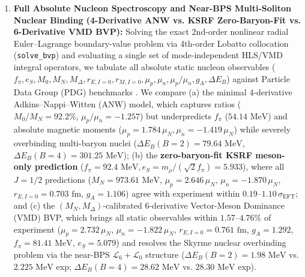 \documentclass[10pt,aps,prd,twocolumn,superscriptaddress,nofootinbib,floatfix,longbibliography,showkeys]{revtex4-2}
\begin{document}
\begin{enumerate}
  \item \textbf{Full Absolute Nucleon Spectroscopy and Near-BPS Multi-Soliton Nuclear Binding (4-Derivative ANW vs. KSRF Zero-Baryon-Fit vs. 6-Derivative VMD BVP):} Solving the exact 2nd-order nonlinear radial Euler--Lagrange boundary-value problem via 4th-order Lobatto collocation (\texttt{solve\_bvp}) and evaluating a single set of mode-independent HLS/VMD integral operators, we tabulate all absolute static nucleon observables ($f_\pi,\allowbreak e_S,\allowbreak M_0,\allowbreak M_N,\allowbreak M_\Delta,\allowbreak r_{E,I=0},\allowbreak r_{M,I=0},\allowbreak \mu_p,\allowbreak \mu_n,\allowbreak \mu_p/\mu_n,\allowbreak g_A,\allowbreak \Delta E_B$) against Particle Data Group (PDG) benchmarks \cite{ref19,ref20}. We compare (a) the minimal 4-derivative Adkins--Nappi--Witten (ANW) model, which captures ratios ($M_0/M_N = 92.2\%$, $\mu_p/\mu_n = -1.257$) but underpredicts $f_\pi$ ($54.14\text{ MeV}$) and absolute magnetic moments ($\mu_p = 1.784\,\mu_N, \mu_n = -1.419\,\mu_N$) while severely overbinding multi-baryon nuclei ($\Delta E_B(B=2) = 79.64\text{ MeV}$, $\Delta E_B(B=4) = 301.25\text{ MeV}$); (b) the \textbf{zero-baryon-fit KSRF meson-only prediction} \cite{ref9,ref10} ($f_\pi = 92.4\text{ MeV}, e_S = m_\rho/(\sqrt{2}f_\pi) = 5.933$), where all $J=1/2$ predictions ($M_N = 973.61\text{ MeV}$, $\mu_p = 2.646\,\mu_N$, $\mu_n = -1.870\,\mu_N$, $r_{E,I=0} = 0.703\text{ fm}$, $g_A = 1.106$) agree with experiment within $0.19\text{--}1.10\,\sigma_{\text{EFT}}$; and (c) the $(M_N, M_\Delta)$-calibrated 6-derivative Vector-Meson Dominance (VMD) BVP, which brings all static observables within $1.57\text{--}4.76\%$ of experiment ($\mu_p = 2.732\,\mu_N$, $\mu_n = -1.822\,\mu_N$, $r_{E,I=0} = 0.761\text{ fm}$, $g_A = 1.292$, $f_\pi = 81.41\text{ MeV}$, $e_S = 5.079$) and resolves the Skyrme nuclear overbinding problem via the near-BPS $\mathcal{L}_6 + \mathcal{L}_0$ structure ($\Delta E_B(B=2) = 1.98\text{ MeV}$ vs. $2.225\text{ MeV}$ exp; $\Delta E_B(B=4) = 28.62\text{ MeV}$ vs. $28.30\text{ MeV}$ exp).

\end{enumerate}
\end{document}
